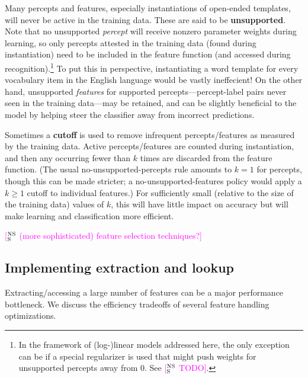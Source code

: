 \documentclass[11pt,letterpaper]{article}
\makeatletter
\newcommand{\ensuretext}[1]{#1}
\newcommand{\nssmarker}{\ensuretext{\textcolor{magenta}{\ensuremath{^{\textsc{NS}}_{\textsc{S}}}}}}
\newcommand{\arkcomment}[3]{\ensuretext{\textcolor{#3}{[#1 #2]}}}
\newcommand{\nss}[1]{\arkcomment{\nssmarker}{#1}{magenta}}
\renewcommand{\paragraph}{%
  \@startsection{paragraph}{4}%
  {\z@}{.2ex \@plus 1ex \@minus .2ex}{-1em}%
  {\normalfont\normalsize\bfseries}%
}
\makeatother
\begin{document}
Many percepts and features, especially instantiations of open-ended templates, will never be active in the training data. 
These are said to be \textbf{unsupported}.
Note that no unsupported {\em percept} will receive nonzero parameter weights during learning, 
so only percepts attested in the training data (found during instantiation) 
need to be included in the feature function (and accessed during recognition).\footnote{In the framework of (log-)linear 
models addressed here, the only exception can be if a special regularizer is used that might push weights for unsupported percepts away from 0. 
See \nss{TODO}.}
To put this in perspective, instantiating a word template for every vocabulary item in the English language would be vastly ineffecient!
On the other hand, unsupported {\em features} for supported percepts---percept-label pairs never seen in the training data---may be retained, 
and can be slightly beneficial to the model by helping steer the classifier away from incorrect predictions. 

Sometimes a \textbf{cutoff} is used to remove infrequent percepts\slash features as measured by the training data.
Active percepts\slash features are counted during instantiation, and then any occurring fewer than $k$ times 
are discarded from the feature function. (The usual no-unsupported-percepts rule amounts to $k=1$ for percepts, 
though this can be made stricter; a no-unsupported-features policy would apply a $k\geq 1$ cutoff to individual features.)
For sufficiently small (relative to the size of the training data) values of $k$, 
this will have little impact on accuracy but will make learning and classification more efficient. 

\nss{(more sophisticated) feature selection techniques?}

\subsection{Implementing extraction and lookup}

Extracting/accessing a large number of features can be a major performance bottleneck. 
We discuss the efficiency tradeoffs of several feature handling optimizations.
\end{document}
